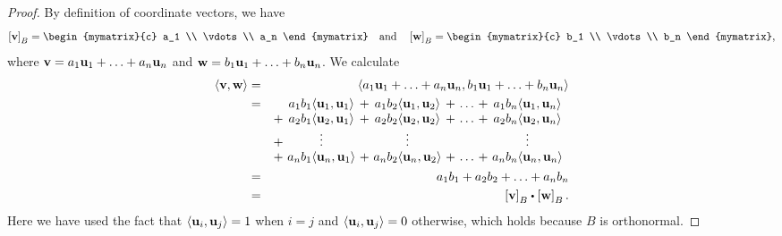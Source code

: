\begin{proof}
  By definition of coordinate vectors, we have
  \begin{equation*}
    \coord{\vect{v}}_B
    = \begin{mymatrix}{c} a_1 \\ \vdots \\ a_n \end{mymatrix}
    \quad\mbox{and}\quad
    \coord{\vect{w}}_B
    = \begin{mymatrix}{c} b_1 \\ \vdots \\ b_n \end{mymatrix},
  \end{equation*}    
  where $\vect{v} = a_1\vect{u}_1 + \ldots + a_n\vect{u}_n$ 
  and $\vect{w} = b_1\vect{u}_1 + \ldots + b_n\vect{u}_n$.
  We calculate
  \begin{eqnarray*}
    \iprod{\vect{v},\vect{w}}
    &=& \iprod{a_1\vect{u}_1 + \ldots + a_n\vect{u}_n, b_1\vect{u}_1 +
        \ldots + b_n\vect{u}_n} \\
    &=& \begin{array}[t]{@{}c@{~}c@{~}c@{~}c@{~}c@{~}c@{~}c@{~}c}
          &   a_1b_1\iprod{\vect{u}_1,\vect{u}_1}
          &+& a_1b_2\iprod{\vect{u}_1,\vect{u}_2}
          &+& \ldots
          &+& a_1b_n\iprod{\vect{u}_1,\vect{u}_n} \\
          +&  a_2b_1\iprod{\vect{u}_2,\vect{u}_1} 
          &+& a_2b_2\iprod{\vect{u}_2,\vect{u}_2}
          &+& \ldots
          &+& a_2b_n\iprod{\vect{u}_2,\vect{u}_n} \\
          +&  \vdots
          && \vdots
          && 
          && \vdots \\
          +&  a_nb_1\iprod{\vect{u}_n,\vect{u}_1}
          &+& a_nb_2\iprod{\vect{u}_n,\vect{u}_2}
          &+& \ldots
          &+& a_nb_n\iprod{\vect{u}_n,\vect{u}_n}
        \end{array} \\
    &=& a_1b_1 + a_2b_2 + \ldots + a_nb_n \\
    &=& \coord{\vect{v}}_B \dotprod \coord{\vect{w}}_B.        
  \end{eqnarray*}
  Here we have used the fact that $\iprod{\vect{u}_i,\vect{u}_j}=1$
  when $i=j$ and $\iprod{\vect{u}_i,\vect{u}_j}=0$ otherwise, which
  holds because $B$ is orthonormal.
\end{proof}
